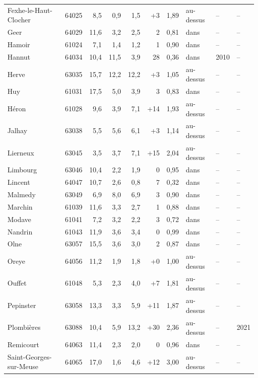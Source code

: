 \begin{longtable}{lrrrrrrlll}
Fexhe-le-Haut-Clocher & 64025 & 8{,}5 & 0{,}9 & 1{,}5 & +3 & 1{,}89 & au-dessus & -- & -- \\
Geer & 64029 & 11{,}6 & 3{,}2 & 2{,}5 & \textminus{}2 & 0{,}81 & dans & -- & -- \\
Hamoir & 61024 & 7{,}1 & 1{,}4 & 1{,}2 & \textminus{}1 & 0{,}90 & dans & -- & -- \\
Hannut & 64034 & 10{,}4 & 11{,}5 & 3{,}9 & \textminus{}28 & 0{,}36 & dans & 2010 & -- \\
Herve & 63035 & 15{,}7 & 12{,}2 & 12{,}2 & +3 & 1{,}05 & au-dessus & -- & -- \\
Huy & 61031 & 17{,}5 & 5{,}0 & 3{,}9 & \textminus{}3 & 0{,}83 & dans & -- & -- \\
Héron & 61028 & 9{,}6 & 3{,}9 & 7{,}1 & +14 & 1{,}93 & au-dessus & -- & -- \\
Jalhay & 63038 & 5{,}5 & 5{,}6 & 6{,}1 & +3 & 1{,}14 & au-dessus & -- & -- \\
Lierneux & 63045 & 3{,}5 & 3{,}7 & 7{,}1 & +15 & 2{,}04 & au-dessus & -- & -- \\
Limbourg & 63046 & 10{,}4 & 2{,}2 & 1{,}9 & \textminus{}0 & 0{,}95 & dans & -- & -- \\
Lincent & 64047 & 10{,}7 & 2{,}6 & 0{,}8 & \textminus{}7 & 0{,}32 & dans & -- & -- \\
Malmedy & 63049 & 6{,}9 & 8{,}0 & 6{,}9 & \textminus{}3 & 0{,}90 & dans & -- & -- \\
Marchin & 61039 & 11{,}6 & 3{,}3 & 2{,}7 & \textminus{}1 & 0{,}88 & dans & -- & -- \\
Modave & 61041 & 7{,}2 & 3{,}2 & 2{,}2 & \textminus{}3 & 0{,}72 & dans & -- & -- \\
Nandrin & 61043 & 11{,}9 & 3{,}6 & 3{,}4 & \textminus{}0 & 0{,}99 & dans & -- & -- \\
Olne & 63057 & 15{,}5 & 3{,}6 & 3{,}0 & \textminus{}2 & 0{,}87 & dans & -- & -- \\
Oreye & 64056 & 11{,}2 & 1{,}9 & 1{,}8 & +0 & 1{,}00 & au-dessus & -- & -- \\
Ouffet & 61048 & 5{,}3 & 2{,}3 & 4{,}0 & +7 & 1{,}81 & au-dessus & -- & -- \\
Pepinster & 63058 & 13{,}3 & 3{,}3 & 5{,}9 & +11 & 1{,}87 & au-dessus & -- & -- \\
Plombières & 63088 & 10{,}4 & 5{,}9 & 13{,}2 & +30 & 2{,}36 & au-dessus & -- & 2021 \\
Remicourt & 64063 & 11{,}4 & 2{,}3 & 2{,}0 & \textminus{}0 & 0{,}96 & dans & -- & -- \\
Saint-Georges-sur-Meuse & 64065 & 17{,}0 & 1{,}6 & 4{,}6 & +12 & 3{,}00 & au-dessus & -- & -- \\

\end{longtable}

